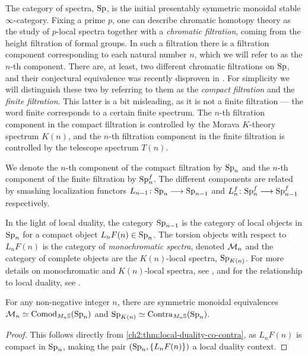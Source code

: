 The category of spectra, $\mathrm{Sp}$, is the initial presentably symmetric monoidal stable $\infty$-category. Fixing a prime $p$, one can describe chromatic homotopy theory as the study of $p$-local spectra together with a \emph{chromatic filtration}, coming from the height filtration of formal groups. In such a filtration there is a filtration component corresponding to each natural number $n$, which we will refer to as the $n$-th component. There are, at least, two different chromatic filtrations on $\mathrm{Sp}$, and their conjectural equivalence was recently disproven in \cite{burklund-hahn-levy-schlank_23}. For simplicity we will distinguish these two by referring to them as the \emph{compact filtration} and the \emph{finite filtration}. This latter is a bit misleading, as it is not a finite filtration --- the word finite corresponds to a certain finite spectrum. The $n$-th filtration component in the compact filtration is controlled by the Morava $K$-theory spectrum $K(n)$, and the $n$-th filtration component in the finite filtration is controlled by the telescope spectrum $T(n)$. 

We denote the $n$-th component of the compact filtration by $\mathrm{Sp}_n$ and the $n$-th component of the finite filtration by $\mathrm{Sp}_n^f$. The different components are related by smashing localization functors $L_{n-1}\colon\mathrm{Sp}_n \longrightarrow \mathrm{Sp}_{n-1}$ and $L_n^f\colon \mathrm{Sp}_n^f \longrightarrow \mathrm{Sp}_{n-1}^f$ respectively. 

In the light of local duality, the category $\mathrm{Sp}_{n-1}$ is the category of local objects in $\mathrm{Sp}_n$ for a compact object $L_nF(n) \in \mathrm{Sp}_n$. The torsion objects with respect to $L_nF(n)$ is the category of \emph{monochromatic spectra}, denoted $\mathcal{M}_{n}$ and the category of complete objects are the $K(n)$-local spectra, $\mathrm{Sp}_{{K(n)}}$. For more details on monochromatic and $K(n)$-local spectra, see \cite{hovey-strickland_99}, and for the relationship to local duality, see \cite[Section 6.2]{barthel-heard-valenzuela_2018}. 

\begin{proposition}
    For any non-negative integer $n$, there are symmetric monoidal equivalences $\mathcal{M}_{n} \simeq \mathrm{Comod}_{M_n\mathbb{S}}(\mathrm{Sp}_n)$ and $\mathrm{Sp}_{{K(n)}}\simeq \mathrm{Contra}_{M_n\mathbb{S}}(\mathrm{Sp}_n)$.
\end{proposition}
\begin{proof}
    This follows directly from \cref{ch2:thm:local-duality-co-contra}, as $L_n F(n)$ is compact in $\mathrm{Sp}_n$, making the pair $(\mathrm{Sp}_n, \{L_nF(n)\})$ a local duality context. 
\end{proof}

